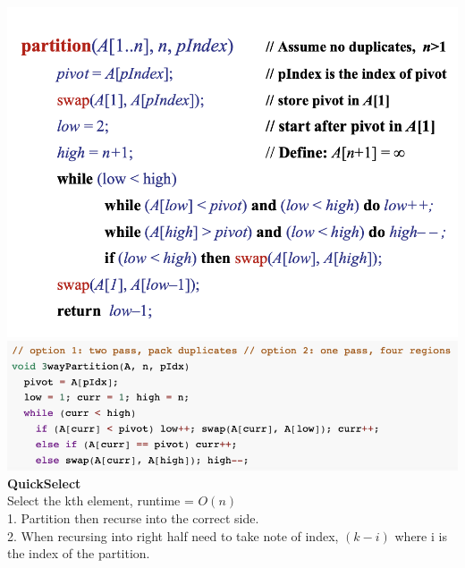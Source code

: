\documentclass[10pt, a4paper]{article}
\begin{document}
\begin{multicols*}{3}
		\includegraphics[scale = .27]{Partition}\\
		\includegraphics[scale=.4]{Partition3}\\
		\textbf{QuickSelect}\\
		Select the kth element, runtime = $O(n)$\\
		1. Partition then recurse into the correct side.\\
		2. When recursing into right half need to take note of index, $(k - i)$ where i is the index of the partition.\\ 
	

\end{multicols*}
\end{document}
